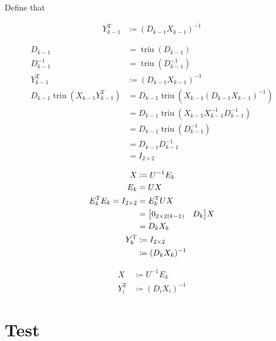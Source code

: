 \documentclass[11pt]{article}
\newcommand{\triu}{\mathop{\mathrm{triu}}}
\newcommand{\T}{\mathrm{T}}
\begin{document}
\noindent Define that

\begin{align*}
    Y_{k-1}^{\T} &\coloneqq (D_{k-1} X_{k-1})^{-1}
\end{align*}


\begin{align*}
    D_{k-1} &= \triu(D_{k-1})\\
    D_{k-1}^{-1} &= \triu(D_{k-1}^{-1})\\
    Y_{k-1}^{\T} &\coloneqq (D_{k-1} X_{k-1})^{-1}\\
    D_{k-1} \triu(X_{k-1}Y_{k-1}^{\T}) &= D_{k-1} \triu(X_{k-1}(D_{k-1} X_{k-1})^{-1})\\
        &= D_{k-1} \triu(X_{k-1} X_{k-1}^{-1} D_{k-1}^{-1})\\
        &= D_{k-1} \triu(D_{k-1}^{-1})\\
        &= D_{k-1} D_{k-1}^{-1}\\
        &= I_{2 \times 2}
\end{align*}







\begin{align*}
    X &\coloneqq U^{-1} E_k\\
    E_{k} &= U X \\
    E_{k}^{\T} E_{k} = I_{2 \times 2} &= E_{k}^{\T} U X \\
        &= \mqty[
            0_{2 \times 2(k-1)} & D_{k}
        ] X \\
        &= D_{k} X_{k} \\
    Y_{k}^{\T} &\coloneqq I_{2 \times 2} \\
        &\coloneqq (D_{k} X_{k})^{-1}
\end{align*}

\begin{align*}
    X &\coloneqq U^{-1} E_{k} \\
    Y_{i}^{\T} &\coloneqq (D_{i} X_{i})^{-1}
\end{align*}












\newpage
\section{Test}
\end{document}
